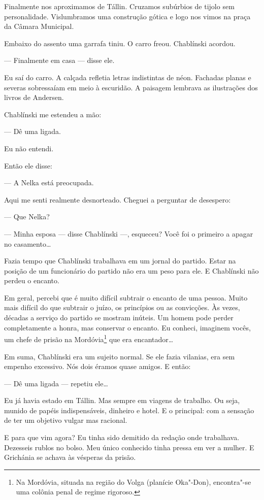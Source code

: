 Finalmente nos aproximamos de Tállin. Cruzamos subúrbios de tijolo sem
personalidade. Vislumbramos uma construção gótica e logo nos vimos na
praça da Câmara Municipal.

Embaixo do assento uma garrafa tiniu. O carro freou. Chablínski acordou.

--- Finalmente em casa --- disse ele.

Eu saí do carro. A calçada refletia letras indistintas de néon. Fachadas
planas e severas sobressaíam em meio à escuridão. A paisagem lembrava as
ilustrações dos livros de Andersen.

Chablínski me estendeu a mão:

--- Dê uma ligada.

Eu não entendi.

Então ele disse:

--- A Nelka está preocupada.

Aqui me senti realmente desnorteado. Cheguei a perguntar de desespero:

--- Que Nelka?

--- Minha esposa --- disse Chablínski ---, esqueceu? Você foi o primeiro
a apagar no casamento\ldots{}

Fazia tempo que Chablínski trabalhava em um jornal do partido. Estar na
posição de um funcionário do partido não era um peso para ele. E
Chablínski não perdeu o encanto.

Em geral, percebi que é muito difícil subtrair o encanto de uma pessoa.
Muito mais difícil do que subtrair o juízo, os princípios ou as
convicções. Às vezes, décadas a serviço do partido se mostram inúteis.
Um homem pode perder completamente a honra, mas conservar o encanto. Eu
conheci, imaginem vocês, um chefe de prisão na Mordóvia\footnote{Na
  Mordóvia, situada na região do Volga (planície Oka"-Don), encontra"-se
  uma colônia penal de regime rigoroso.} que era encantador\ldots{}

Em suma, Chablínski era um sujeito normal. Se ele fazia vilanias, era
sem empenho excessivo. Nós dois éramos quase amigos. E então:

--- Dê uma ligada --- repetiu ele\ldots{}

Eu já havia estado em Tállin. Mas sempre em viagens de trabalho. Ou
seja, munido de papéis indispensáveis, dinheiro e hotel. E o principal:
com a sensação de ter um objetivo vulgar mas racional.

E para que vim agora? Eu tinha sido demitido da redação onde trabalhava.
Dezesseis rublos no bolso. Meu único conhecido tinha pressa em ver a
mulher. E Grichánia se achava às vésperas da prisão.

